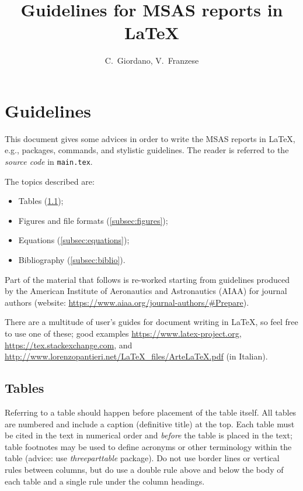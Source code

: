\documentclass[11pt,a4paper,oneside]{article}
\title{Guidelines for MSAS reports in \LaTeX} %
\author{\large C.\ Giordano, V.\ Franzese}
\date{}
\begin{document}
\maketitle
\thispagestyle{fancy}
\section{Guidelines}%
This document gives some advices in order to write the MSAS reports in \LaTeX, e.g., packages, commands, and  stylistic guidelines. The reader is referred to the \emph{source code} in \verb|main.tex|. 

The topics described are:
%
\begin{itemize}
    \item Tables (\cref{subsec:tables});
    \item Figures and file formats (\cref{subsec:figures});
    \item Equations (\cref{subsec:equations});
    \item Bibliography (\cref{subsec:biblio}).
\end{itemize}

Part of the material that follows is re-worked starting from guidelines produced by the American Institute of Aeronautics and Astronautics (AIAA) for journal authors (website: \url{https://www.aiaa.org/journal-authors/#Prepare}).

There are a multitude of user's guides for document writing in \LaTeX, so feel free to use one of these; good examples \url{https://www.latex-project.org}, \url{https://tex.stackexchange.com}, and \url{http://www.lorenzopantieri.net/LaTeX_files/ArteLaTeX.pdf} (in Italian).


\subsection{Tables}\label{subsec:tables}
Referring to a table should happen before placement of the table itself.
All tables are numbered and include a caption (definitive title) at the top. Each table must be cited in the text in numerical order and \emph{before} the table is placed in the text; table footnotes may be used to define acronyms or other terminology within the table (advice: use \emph{threeparttable} package). Do not use border lines or vertical rules between columns, but do use a double rule above and below the body of each table and a single rule under the column headings.
\end{document}
